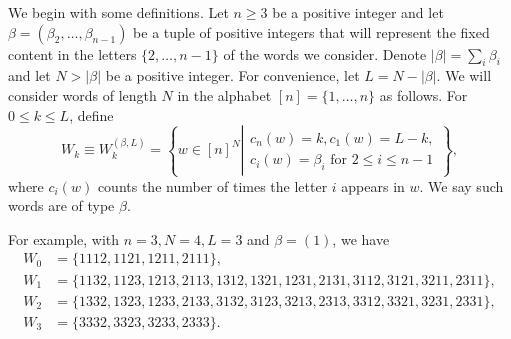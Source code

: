 We begin with some definitions. Let $n \geq 3$ be a positive integer and let $\beta = (\beta_2,\dots, \beta_{n-1})$ be a tuple of positive integers that will represent the fixed content in the letters $\{2,\ldots,n-1\}$ of the words we consider. 
Denote $|\beta| = \sum_i \beta_i$ and let $N > |\beta|$ be a positive integer. For convenience, let $L = N - |\beta|$.
We will consider words of length $N$ in the alphabet $[n] = \{1,\dots, n\}$ as follows. For $0 \leq k \leq L$, define
\begin{equation}
\label{wk-def}
W_k \equiv W^{(\beta,L)}_k = \left\{ w \in [n]^N 
\left| 
\begin{matrix}
c_n(w) = k, c_1(w) = L-k,  \\
c_i(w) = \beta_i \text{ for } 2 \leq i \leq n-1
\end{matrix}  
\right. \right\},
\end{equation}
where $c_i(w)$ counts the number of times the letter $i$ appears in $w$. We say such words are of type $\beta$.

\begin{example}
\label{eg:Wk}
For example, with $n=3, N = 4, L = 3$ and $\beta = (1)$, we have
\begin{equation}
\label{Wk-eg}
\begin{split}
W_0 &= \{1112, 1121, 1211, 2111\}, \\
W_1 &= \{1132, 1123, 1213, 2113,1312, 1321, 1231, 2131,3112, 3121, 3211, 2311\}, \\
W_2 &= \{1332, 1323, 1233, 2133,3132, 3123, 3213, 2313,3312, 3321, 3231, 2331\},\\
W_3 &= \{3332, 3323, 3233, 2333\}.
\end{split}
\end{equation}
\end{example}

